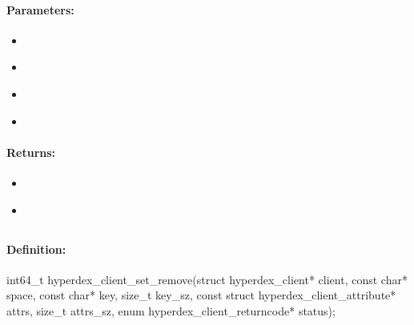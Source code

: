\paragraph{Parameters:}
\begin{itemize}[noitemsep]
\item {}\\

\item {}\\

\item {}\\

\item {}\\

\end{itemize}

\paragraph{Returns:}
\begin{itemize}[noitemsep]
\item {}\\

\item {}\\

\end{itemize}

\pagebreak
\subsection{}
\label{api:c:set_remove}


\paragraph{Definition:}
\begin{ccode}
int64_t hyperdex_client_set_remove(struct hyperdex_client* client,
        const char* space,
        const char* key, size_t key_sz,
        const struct hyperdex_client_attribute* attrs, size_t attrs_sz,
        enum hyperdex_client_returncode* status);
\end{ccode}

